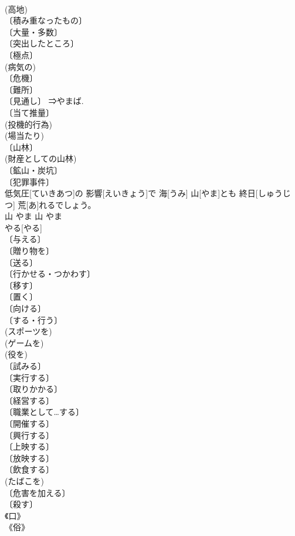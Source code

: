 \documentclass[8pt]{extreport}
\begin{document}
\begin{CJK}{UTF8}{min}
\\	(高地) 
\\	〔積み重なったもの〕 
\\	〔大量・多数〕 
\\	〔突出したところ〕 
\\	〔極点〕 
\\	(病気の) 
\\	〔危機〕 
\\	〔難所〕 
\\	〔見通し〕 ⇒やまば. 
\\	〔当て推量〕 
\\	(投機的行為) 
\\	(場当たり) 
\\	〔山林〕 
\\	(財産としての山林) 
\\	〔鉱山・炭坑〕 
\\	〔犯罪事件〕 
\\	低気圧[ていきあつ]の 影響[えいきょう]で 海[うみ] 山[やま]とも 終日[しゅうじつ] 荒[あ]れるでしょう。	
\\	山	やま	山	やま	
\\	やる[やる]	
\\	〔与える〕 
\\	〔贈り物を〕 
\\	〔送る〕 
\\	〔行かせる・つかわす〕 
\\	〔移す〕 
\\	〔置く〕 
\\	〔向ける〕 
\\	〔する・行う〕 
\\	(スポーツを) 
\\	(ゲームを) 
\\	(役を) 
\\	〔試みる〕 
\\	〔実行する〕 
\\	〔取りかかる〕 
\\	〔経営する〕 
\\	〔職業として…する〕 
\\	〔開催する〕 
\\	〔興行する〕 
\\	〔上映する〕 
\\	〔放映する〕 
\\	〔飲食する〕 
\\	(たばこを) 
\\	〔危害を加える〕 
\\	〔殺す〕 
\\	《口》 
\\	《俗》 

\end{CJK}
\end{document}
